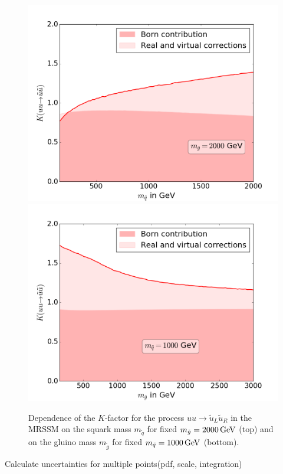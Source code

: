 \begin{figure}[!htpb]
\begin{center}
\includegraphics[scale=.5]{figures/MRSSM_uu_susu_Kfactors_msg=2000GeV.png}
\includegraphics[scale=.5]{figures/MRSSM_uu_susu_Kfactors_msq=1000GeV.png}
\caption{Dependence of the $K$-factor for the process $uu \to \tilde{u}_L\tilde{u}_R$ in the MRSSM on the squark mass $m_{\tilde{q}}$ for fixed $m_{\tilde{g}} = \unit[2000]{GeV}$ (top) and on the gluino mass $m_{\tilde{g}}$ for fixed $m_{\tilde{q}} = \unit[1000]{GeV}$ (bottom).}\label{fig:1LXsection_fixed_m}
\end{center}
\end{figure}
Calculate uncertainties for multiple points(pdf, scale, integration)


